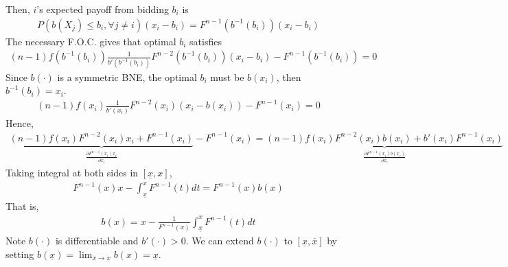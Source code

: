 \documentclass[11pt]{elegantbook_2}
\begin{document}
Then, $i$'s expected payoff from bidding $b_i$ is
\begin{equation}
    \begin{aligned}
        P(b(X_j)\leq b_i,\forall j\neq i)(x_i-b_i)=F^{n-1}(b^{-1}(b_i))(x_i-b_i)
    \end{aligned}
    \nonumber
\end{equation}
The necessary F.O.C. gives that optimal $b_i$ satisfies
\begin{equation}
    \begin{aligned}
        (n-1)f(b^{-1}(b_i))\frac{1}{b'(b^{-1}(b_i))}F^{n-2}(b^{-1}(b_i))(x_i-b_i)-F^{n-1}(b^{-1}(b_i))=0
    \end{aligned}
    \nonumber
\end{equation}
Since $b(\cdot)$ is a symmetric BNE, the optimal $b_i$ must be $b(x_i)$, then $b^{-1}(b_i)=x_i$.
\begin{equation}
    \begin{aligned}
        (n-1)f(x_i)\frac{1}{b'(x_i)}F^{n-2}(x_i)(x_i-b(x_i))-F^{n-1}(x_i)=0
    \end{aligned}
    \nonumber
\end{equation}
Hence,
\begin{equation}
    \begin{aligned}
        \underbrace{(n-1)f(x_i)F^{n-2}(x_i)x_i+F^{n-1}(x_i)}_{\frac{\partial F^{n-1}(x_i)x_i}{\partial x_i}}-F^{n-1}(x_i)=\underbrace{(n-1)f(x_i)F^{n-2}(x_i)b(x_i)+b'(x_i)F^{n-1}(x_i)}_{\frac{\partial F^{n-1}(x_i)b(x_i)}{\partial x_i}}
    \end{aligned}
    \nonumber
\end{equation}
Taking integral at both sides in $[\underline{x},x]$,
\begin{equation}
    \begin{aligned}
        F^{n-1}(x)x-\int_{\underline{x}}^x F^{n-1}(t) dt= F^{n-1}(x)b(x)
    \end{aligned}
    \nonumber
\end{equation}
That is,
\begin{equation}
    \begin{aligned}
        b(x)=x-\frac{1}{F^{n-1}(x)}\int_{\underline{x}}^x F^{n-1}(t) dt
    \end{aligned}
    \label{FPA:symmetric BNE}
\end{equation}
Note $b(\cdot)$ is differentiable and $b'(\cdot)>0$. We can extend $b(\cdot)$ to $[\underline{x},\overline{x}]$ by setting $b(\underline{x})=\lim_{x \rightarrow \underline{x}} b(x)=\underline{x}$.
\end{document}
